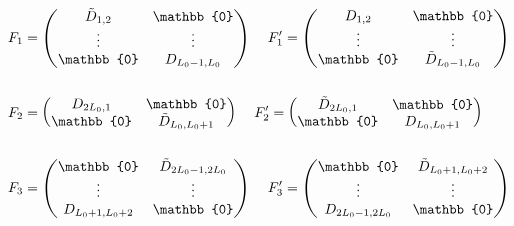 \begin{equation}
    \begin{split}
        &F_1 = \begin{pmatrix}
        \Tilde{D}_{1,2} & \mathbb{0} \\
        \vdots & \vdots \\
        \mathbb{0} & D_{L_0 -1, L_0} \\
    \end{pmatrix} \hspace{4mm} F_1' = \begin{pmatrix}
        D_{1,2} & \mathbb{0} \\
        \vdots & \vdots \\
        \mathbb{0} & \Tilde{D}_{L_0 -1, L_0} \\
    \end{pmatrix} \\ \\ 
    &F_2 = \begin{pmatrix}
        D_{2L_0, 1} & \mathbb{0} \\
        \mathbb{0}& \Tilde{D}_{L_0, L_0 + 1} \\
    \end{pmatrix} \hspace{4mm} F_2' = \begin{pmatrix}
        \Tilde{D}_{2L_0, 1} & \mathbb{0} \\
        \mathbb{0}& D_{L_0, L_0 + 1} \\
    \end{pmatrix} \\ \\
    &F_3 = \begin{pmatrix}
        \mathbb{0} & \Tilde{D}_{2L_0 - 1,2L_0} \\
        \vdots & \vdots \\
        D_{L_0 + 1, L_0 + 2} & \mathbb{0} \\
    \end{pmatrix} \hspace{4mm} F_3' = \begin{pmatrix}
        \mathbb{0} & \Tilde{D}_{L_0 + 1, L_0 + 2} \\
        \vdots & \vdots \\
        D_{2L_0 - 1, 2L_0} & \mathbb{0} \\
    \end{pmatrix}
    \end{split}
\end{equation}

